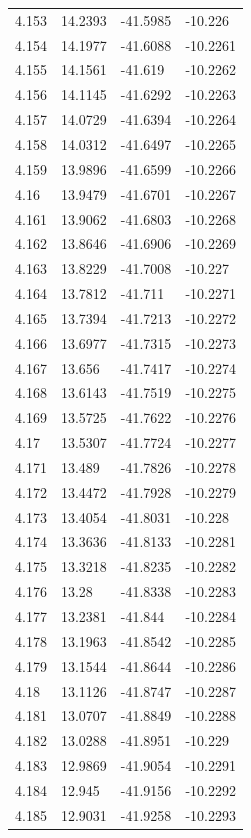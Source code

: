 \begin{tabular}{llll}
4.153 & 14.2393 & -41.5985 & -10.226 \\
4.154 & 14.1977 & -41.6088 & -10.2261 \\
4.155 & 14.1561 & -41.619 & -10.2262 \\
4.156 & 14.1145 & -41.6292 & -10.2263 \\
4.157 & 14.0729 & -41.6394 & -10.2264 \\
4.158 & 14.0312 & -41.6497 & -10.2265 \\
4.159 & 13.9896 & -41.6599 & -10.2266 \\
4.16 & 13.9479 & -41.6701 & -10.2267 \\
4.161 & 13.9062 & -41.6803 & -10.2268 \\
4.162 & 13.8646 & -41.6906 & -10.2269 \\
4.163 & 13.8229 & -41.7008 & -10.227 \\
4.164 & 13.7812 & -41.711 & -10.2271 \\
4.165 & 13.7394 & -41.7213 & -10.2272 \\
4.166 & 13.6977 & -41.7315 & -10.2273 \\
4.167 & 13.656 & -41.7417 & -10.2274 \\
4.168 & 13.6143 & -41.7519 & -10.2275 \\
4.169 & 13.5725 & -41.7622 & -10.2276 \\
4.17 & 13.5307 & -41.7724 & -10.2277 \\
4.171 & 13.489 & -41.7826 & -10.2278 \\
4.172 & 13.4472 & -41.7928 & -10.2279 \\
4.173 & 13.4054 & -41.8031 & -10.228 \\
4.174 & 13.3636 & -41.8133 & -10.2281 \\
4.175 & 13.3218 & -41.8235 & -10.2282 \\
4.176 & 13.28 & -41.8338 & -10.2283 \\
4.177 & 13.2381 & -41.844 & -10.2284 \\
4.178 & 13.1963 & -41.8542 & -10.2285 \\
4.179 & 13.1544 & -41.8644 & -10.2286 \\
4.18 & 13.1126 & -41.8747 & -10.2287 \\
4.181 & 13.0707 & -41.8849 & -10.2288 \\
4.182 & 13.0288 & -41.8951 & -10.229 \\
4.183 & 12.9869 & -41.9054 & -10.2291 \\
4.184 & 12.945 & -41.9156 & -10.2292 \\
4.185 & 12.9031 & -41.9258 & -10.2293 \\

\end{tabular}
